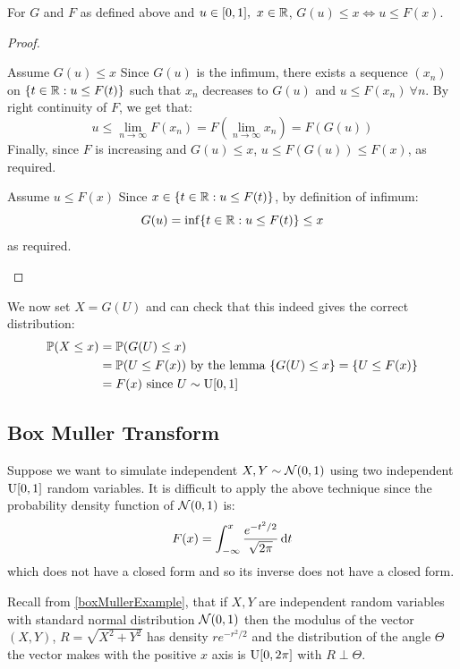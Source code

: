 \documentclass[../main.tex]{subfiles}
\begin{document}
\begin{lemma}
  For $G$ and $F$ as defined above and $u \in [0, 1],\ x \in \mathbb{R}$, $G(u) \leq x \iff u \leq F(x)$.
\end{lemma}
\begin{proof}
  \begin{proofdirection}{Assume $G(u) \leq x$}
    Since $G(u)$ is the infimum, there exists a sequence $(x_n)$ on $\{t \in \mathbb{R}: u \leq F(t)\}$ such that $x_n$ decreases to $G(u)$ and $u \leq F(x_n)\ \forall n$.
    By right continuity of $F$, we get that:
    \[
      u \leq \lim_{n \to \infty} F(x_n) = F\left(\lim_{n \to \infty} x_n\right) = F(G(u))
    \]
    Finally, since $F$ is increasing and $G(u) \leq x$, $u \leq F(G(u)) \leq F(x)$, as required.
  \end{proofdirection}
  \begin{proofdirection}{Assume $u \leq F(x)$}
    Since $x \in \{t \in \mathbb{R} : u \leq F(t)\}$, by definition of infimum:
    \[
      G(u) = \inf \{t \in \mathbb{R}: u \leq F(t)\} \leq x
    \]
    as required.
  \end{proofdirection}
\end{proof}
We now set $X = G(U)$ and can check that this indeed gives the correct distribution:
\begin{align*}
  \mathbb{P}(X \leq x) &= \mathbb{P}(G(U) \leq x) \\
               &= \mathbb{P}(U \leq F(x)) \text{ by the lemma } \{G(U) \leq x\} = \{U \leq F(x)\} \\
               &= F(x) \text{ since $U \sim \operatorname{U}[0, 1]$}
\end{align*}
\subsection{Box Muller Transform}
Suppose we want to simulate independent $X, Y \sim \operatorname{\mathcal{N}}(0, 1)$ using two independent $\operatorname{U}[0,1]$ random variables.
It is difficult to apply the above technique since the probability density function of $\operatorname{\mathcal{N}}(0, 1)$ is:
\[
  F(x) = \int_{-\infty}^{x} \frac{e^{-t^2/2}}{\sqrt{2\pi}} \d{t}
\]
which does not have a closed form and so its inverse does not have a closed form.

Recall from \cref{boxMullerExample}, that if $X, Y$ are independent random variables with standard normal distribution $\operatorname{\mathcal{N}}(0, 1)$ then the modulus of the vector $(X, Y)$, $R = \sqrt{X^2 + Y^2}$ has density $re^{-r^2/2}$ and the distribution of the angle $\Theta$ the vector makes with the positive $x$ axis is $\operatorname{U}[0, 2\pi]$ with $R \perp \Theta$.
\end{document}
